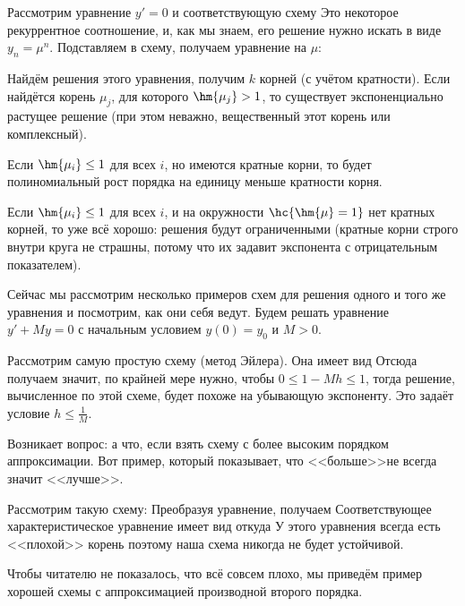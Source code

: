 \documentclass[a4paper]{article}
\begin{document}
Рассмотрим уравнение $y' = 0$ и соответствующую схему
Это некоторое рекуррентное соотношение, и, как мы знаем, его решение
нужно искать в виде $y_n = \mu^n$. Подставляем в схему, получаем уравнение на $\mu$:

Найдём решения этого уравнения, получим $k$ корней (с учётом кратности).
Если найдётся корень $\mu_j$, для которого $\hm{\mu_j} > 1$, то существует экспоненциально растущее решение
(при этом неважно, вещественный этот корень или комплексный).

Если $\hm{\mu_i} \le 1$ для всех $i$, но имеются кратные корни, то будет полиномиальный рост
порядка на единицу меньше кратности корня.

Если $\hm{\mu_i} \le 1$ для всех $i$, и на окружности $\hc{\hm{\mu} = 1}$ нет кратных корней, то уже всё хорошо: решения
будут ограниченными (кратные корни строго внутри круга не страшны, потому что их задавит экспонента с отрицательным
показателем).

Сейчас мы рассмотрим несколько примеров схем для решения одного и того же
уравнения и посмотрим, как они себя ведут.
Будем решать уравнение $y' + My = 0$ с начальным условием $y(0) = y_0$ и $M > 0$.

\begin{ex}
Рассмотрим самую простую схему (метод Эйлера). Она имеет вид
Отсюда получаем
значит, по крайней мере нужно, чтобы $0\le 1 - Mh \le 1$, тогда решение, вычисленное по этой схеме,
будет похоже на убывающую экспоненту. Это задаёт условие $h \le \frac{1}{M}$.
\end{ex}

Возникает вопрос: а что, если взять схему с более высоким порядком аппроксимации.
Вот пример, который показывает, что <<больше>>\т не всегда значит <<лучше>>.

\begin{ex}
Рассмотрим такую схему:
Преобразуя уравнение, получаем
Соответствующее характеристическое уравнение имеет вид
откуда
У этого уравнения всегда есть <<плохой>> корень
поэтому наша схема никогда не будет устойчивой.
\end{ex}

Чтобы читателю не показалось, что всё совсем плохо, мы приведём пример хорошей схемы
с аппроксимацией производной второго порядка.
\end{document}
